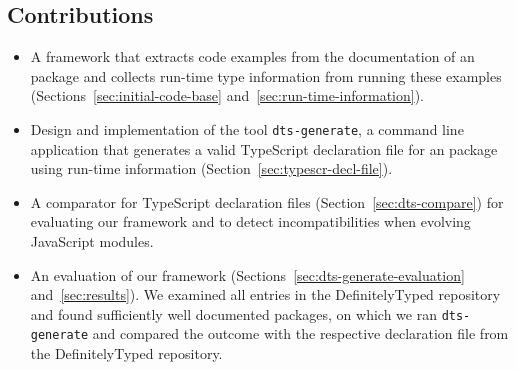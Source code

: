 \documentclass[sigplan,screen]{acmart}
\begin{document}
\subsection{Contributions}
\label{sec:contributions}


\begin{itemize}
\item A framework that extracts code examples from the
  documentation of an \NPM{} package and collects run-time type
  information from running these examples (Sections~\ref{sec:initial-code-base}
  and~\ref{sec:run-time-information}). 

\item Design and implementation of the tool \texttt{dts-generate}, a command line
  application that generates a valid TypeScript declaration file for
  an \NPM{} package using run-time information
  (Section~\ref{sec:typescr-decl-file}). 

\item A comparator for TypeScript declaration files
  (Section~\ref{sec:dts-compare}) for evaluating our framework and to
  detect   incompatibilities when evolving JavaScript modules.
\item An evaluation of our framework (Sections~\ref{sec:dts-generate-evaluation}
  and~\ref{sec:results}). We examined all \CountTotalModulesDefinitelyTyped{} entries in 
  the DefinitelyTyped repository and found \CountModulesGeneratedDeclarationFile{} sufficiently
  well documented \NPM{} packages, on which we ran \texttt{dts-generate}
  and compared the outcome with the respective declaration file from the
  DefinitelyTyped repository. 
\end{itemize}
\end{document}
